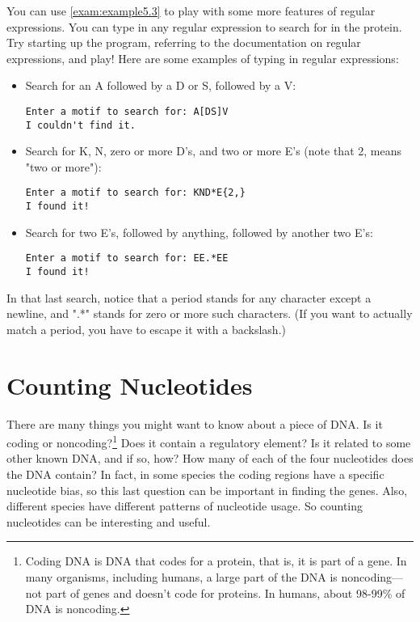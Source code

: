 You can use \autoref{exam:example5.3} to play with some more features of regular expressions. You can type in any regular expression to search for in the protein. Try starting up the program, referring to the documentation on regular expressions, and play! Here are some examples of typing in regular expressions: 

\begin{itemize}
  \item Search for an A followed by a D or S, followed by a V: 
\begin{lstlisting}
Enter a motif to search for: A[DS]V
I couldn't find it.
\end{lstlisting}
  \item Search for K, N, zero or more D's, and two or more E's (note that {2,} means "two or more"): 
\begin{lstlisting}
Enter a motif to search for: KND*E{2,}
I found it!
\end{lstlisting}
  \item Search for two E's, followed by anything, followed by another two E's: 
\begin{lstlisting}
Enter a motif to search for: EE.*EE
I found it!
\end{lstlisting}
\end{itemize}

In that last search, notice that a period stands for any character except a newline, and ".*" stands for zero or more such characters. (If you want to actually match a period, you have to escape it with a backslash.) 

\section{Counting Nucleotides}
There are many things you might want to know about a piece of DNA. Is it coding or noncoding?\footnote{Coding DNA is DNA that codes for a protein, that is, it is part of a gene. In many organisms, including humans, a large part of the DNA is noncoding—not part of genes and doesn't code for proteins. In humans, about 98-99\% of DNA is noncoding.} Does it contain a regulatory element? Is it related to some other known DNA, and if so, how? How many of each of the four nucleotides does the DNA contain? In fact, in some species the coding regions have a specific nucleotide bias, so this last question can be important in finding the genes. Also, different species have different patterns of nucleotide usage. So counting nucleotides can be interesting and useful.

